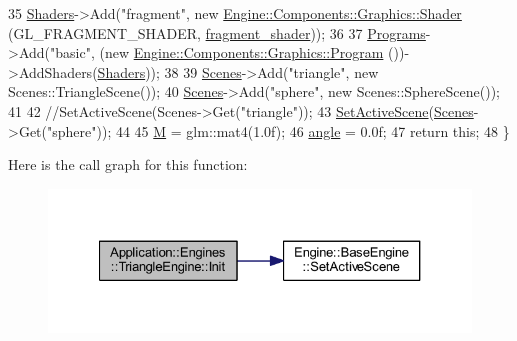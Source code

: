 \begin{DoxyCode}
35     \mbox{\hyperlink{classEngine_1_1BaseEngine_a2582dee3f73da82bb422b43317b85e3b}{Shaders}}->Add(\textcolor{stringliteral}{"fragment"}, \textcolor{keyword}{new} \mbox{\hyperlink{classEngine_1_1Components_1_1Graphics_1_1Shader}{Engine::Components::Graphics::Shader}}
      (GL\_FRAGMENT\_SHADER, \mbox{\hyperlink{ZPGEngine_8cpp_ab187f2ba2a2f72ea5571921a1a856582}{fragment\_shader}}));
36 
37     \mbox{\hyperlink{classEngine_1_1BaseEngine_ae0f86360ea3a384caefe443dd8f88601}{Programs}}->Add(\textcolor{stringliteral}{"basic"}, (\textcolor{keyword}{new} \mbox{\hyperlink{classEngine_1_1Components_1_1Graphics_1_1Program}{Engine::Components::Graphics::Program}}
      ())->AddShaders(\mbox{\hyperlink{classEngine_1_1BaseEngine_a2582dee3f73da82bb422b43317b85e3b}{Shaders}}));
38 
39     \mbox{\hyperlink{classEngine_1_1BaseEngine_afd02af3c2fbe9bb734db014dec06585a}{Scenes}}->Add(\textcolor{stringliteral}{"triangle"}, \textcolor{keyword}{new} Scenes::TriangleScene());
40     \mbox{\hyperlink{classEngine_1_1BaseEngine_afd02af3c2fbe9bb734db014dec06585a}{Scenes}}->Add(\textcolor{stringliteral}{"sphere"}, \textcolor{keyword}{new} Scenes::SphereScene());
41 
42     \textcolor{comment}{//SetActiveScene(Scenes->Get("triangle"));}
43     \mbox{\hyperlink{classEngine_1_1BaseEngine_afc82c6a00d5a9d4714740fc5eab5db86}{SetActiveScene}}(\mbox{\hyperlink{classEngine_1_1BaseEngine_afd02af3c2fbe9bb734db014dec06585a}{Scenes}}->Get(\textcolor{stringliteral}{"sphere"}));
44 
45     \mbox{\hyperlink{classApplication_1_1Engines_1_1TriangleEngine_a12ea2b98b8900cccf469e0bf0ea89316}{M}} = glm::mat4(1.0f);
46     \mbox{\hyperlink{classApplication_1_1Engines_1_1TriangleEngine_a71526be47b8a14b2f9980fa3ff1022b2}{angle}} = 0.0f;
47     \textcolor{keywordflow}{return} \textcolor{keyword}{this};
48 \}
\end{DoxyCode}
Here is the call graph for this function\+:
\nopagebreak
\begin{figure}[H]
\begin{center}
\leavevmode
\includegraphics[width=327pt]{classApplication_1_1Engines_1_1TriangleEngine_a4fc68c683c3beaadf7d41f36627d3492_cgraph}
\end{center}
\end{figure}
\mbox{\label{classEngine_1_1BaseEngine_a7a1c9b833049b3eb61194cab113dfe89}} 
